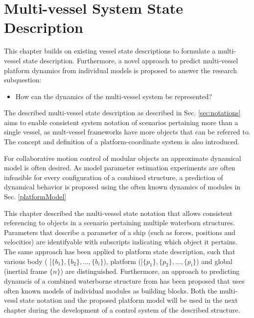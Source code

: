 \chapter{Multi-vessel System State Description}
\label{chap:stateDescription}
This chapter builds on existing vessel state descriptions to formulate a multi-vessel state description. Furthermore, a novel approach to predict multi-vessel platform dynamics from individual models is proposed to  answer the research subquestion:

\begin{itemize}
	\item How can the dynamics of the multi-vessel system be represented?
\end{itemize}
The described multi-vessel state description as described in Sec. \ref{sec:notations} aims to enable consistent system notation of scenarios pertaining more than a single vessel, as mult-vessel frameworks have more objects that can be referred to. The concept and definition of a platform-coordinate system is also introduced.

For collaborative motion control of modular objects an approximate dynamical model is often desired. As model parameter estimation experiments are often infeasible for every configuration of a combined structure, a prediction of dynamical behavior is proposed using the often known dynamics of modules in Sec. \ref{platformModel}





\vspace{20mm}

This chapter described the multi-vessel state notation that allows consistent referencing to objects in a scenario pertaining multiple waterborn structures. Parameters that describe a parameter of a ship (such as forces, positions and velocities) are identifyable with subscripts indicating which object it pertains. The same approach has been applied to platform state description, such that various body ( $[\{b_1\},\{b_2\}, ...,\{b_i\}$), platform  ($[\{p_1\},\{p_2\}, ...,\{p_i\}$) and global (inertial frame $\{n\}$) are distinguished. 
Furthermore, an approach to predicting dynamcis of a combined waterborne structure from has been proposed that uses often known models of individual modules as building blocks. 
Both the multi-vessl state notation and the proposed platform model will be used in the next chapter during the development of a control system of the described structure. 




